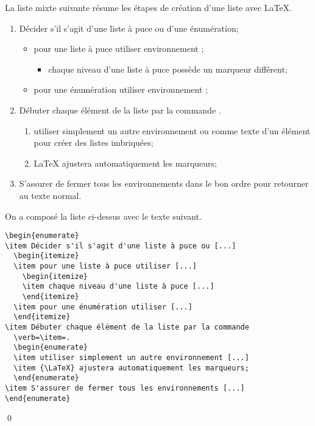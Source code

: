 \begin{exemple}
  La liste mixte suivante résume les étapes de création d'une liste
  avec {\LaTeX}.
  \begin{enumerate}
  \item Décider s'il s'agit d'une liste à puce ou d'une énumération;
    \begin{itemize}
    \item pour une liste à puce utiliser environnement ;
      \begin{itemize}
      \item chaque niveau d'une liste à puce possède un marqueur
        différent;
      \end{itemize}
    \item pour une énumération utiliser environnement ;
    \end{itemize}
  \item Débuter chaque élément de la liste par la commande
    \cmdprint{\item}.
    \begin{enumerate}
    \item utiliser simplement un autre environnement  ou
       comme texte d'un élément pour créer des listes
      imbriquées;
    \item {\LaTeX} ajustera automatiquement les marqueurs;
    \end{enumerate}
  \item S'assurer de fermer tous les environnements dans le bon ordre
    pour retourner au texte normal.
  \end{enumerate}

  On a composé la liste ci-dessus avec le texte suivant.
  \begin{demo}
\begin{lstlisting}[emph={enumerate,itemize}]
\begin{enumerate}
\item Décider s'il s'agit d'une liste à puce ou [...]
  \begin{itemize}
  \item pour une liste à puce utiliser [...]
    \begin{itemize}
    \item chaque niveau d'une liste à puce [...]
    \end{itemize}
  \item pour une énumération utiliser [...]
  \end{itemize}
\item Débuter chaque élément de la liste par la commande
  \verb=\item=.
  \begin{enumerate}
  \item utiliser simplement un autre environnement [...]
  \item {\LaTeX} ajustera automatiquement les marqueurs;
  \end{enumerate}
\item S'assurer de fermer tous les environnements [...]
\end{enumerate}
\end{lstlisting}
  \end{demo}
  \qed
\end{exemple}


